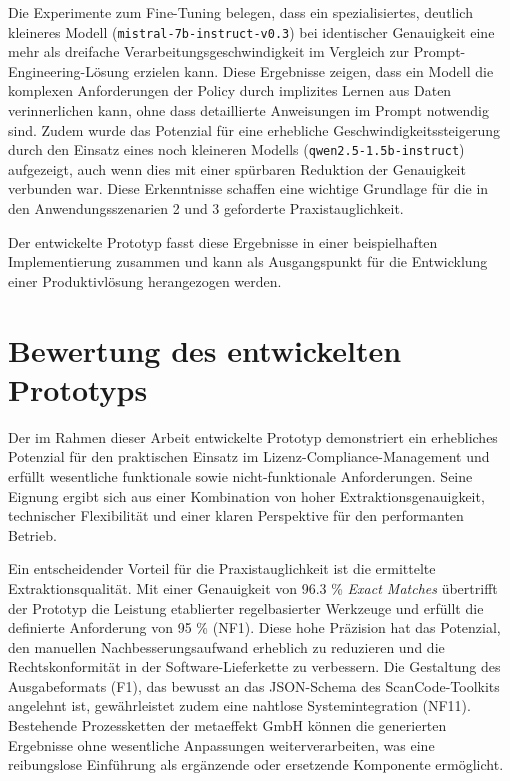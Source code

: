 Die Experimente zum Fine-Tuning belegen, dass ein spezialisiertes, deutlich kleineres Modell (\texttt{mistral-7b-instruct-v0.3}) bei identischer Genauigkeit eine mehr als dreifache Verarbeitungsgeschwindigkeit im Vergleich zur Prompt-Engineering-Lösung erzielen kann.
Diese Ergebnisse zeigen, dass ein Modell die komplexen Anforderungen der Policy durch implizites Lernen aus Daten verinnerlichen kann, ohne dass detaillierte Anweisungen im Prompt notwendig sind.
Zudem wurde das Potenzial für eine erhebliche Geschwindigkeitssteigerung durch den Einsatz eines noch kleineren Modells (\texttt{qwen2.5-1.5b-instruct}) aufgezeigt, auch wenn dies mit einer spürbaren Reduktion der Genauigkeit verbunden war.
Diese Erkenntnisse schaffen eine wichtige Grundlage für die in den Anwendungsszenarien 2 und 3 geforderte Praxistauglichkeit.

Der entwickelte Prototyp fasst diese Ergebnisse in einer beispielhaften Implementierung zusammen und kann als Ausgangspunkt für die Entwicklung einer Produktivlösung herangezogen werden.


\section{Bewertung des entwickelten Prototyps}

Der im Rahmen dieser Arbeit entwickelte Prototyp demonstriert ein erhebliches Potenzial für den praktischen Einsatz im Lizenz-Compliance-Management und erfüllt wesentliche funktionale sowie nicht-funktionale Anforderungen.
Seine Eignung ergibt sich aus einer Kombination von hoher Extraktionsgenauigkeit, technischer Flexibilität und einer klaren Perspektive für den performanten Betrieb.

Ein entscheidender Vorteil für die Praxistauglichkeit ist die ermittelte Extraktionsqualität.
Mit einer Genauigkeit von \num{96,3} \% \textit{Exact Matches} übertrifft der Prototyp die Leistung etablierter regelbasierter Werkzeuge und erfüllt die definierte Anforderung von \num{95} \% (NF1).
Diese hohe Präzision hat das Potenzial, den manuellen Nachbesserungsaufwand erheblich zu reduzieren und die Rechtskonformität in der Software-Lieferkette zu verbessern.
Die Gestaltung des Ausgabeformats (F1), das bewusst an das JSON-Schema des ScanCode-Toolkits angelehnt ist, gewährleistet zudem eine nahtlose Systemintegration (NF11).
Bestehende Prozessketten der metaeffekt GmbH können die generierten Ergebnisse ohne wesentliche Anpassungen weiterverarbeiten, was eine reibungslose Einführung als ergänzende oder ersetzende Komponente ermöglicht.

